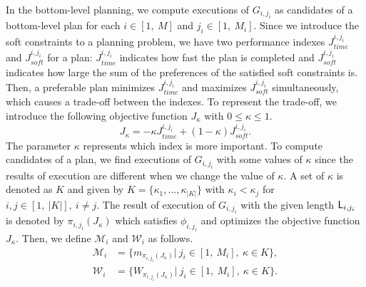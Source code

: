 \documentclass[journal,twoside,web]{IEEEtran}
\newcommand{\Len}{{\sf L}}
\newcommand{\red}[1]{\textcolor{red}{#1}}
\begin{document}
In the bottom-level planning, we compute executions of $G_{i,{j_i}}$ as candidates of a bottom-level plan for each $i\in[1,~M]$ and $j_i\in[1,~M_i]$.
%
Since we introduce the soft constraints to a planning problem, we have two performance indexes $J_{time}^{i,j_i}$ and $J_{soft}^{i,j_i}$ for a plan: $J_{time}^{i,j_i}$ indicates how fast the plan is completed and $J_{soft}^{i,j_i}$ indicates how large the sum of the preferences of the satisfied soft constraints is.
Then, a preferable plan minimizes $J_{time}^{i,j_i}$ and maximizes $J_{soft}^{i,j_i}$ simultaneously, which causes a trade-off between the indexes. 
To represent the trade-off, we introduce the following objective function $J_{\kappa}$ with $0 \leq \kappa \leq 1$.
\begin{equation}
J_{\kappa}=-\kappa J_{time}^{i,j_i} + (1-\kappa) J_{soft}^{i,j_i}.
\end{equation}
The parameter $\kappa$ represents which index is more important.
%
To compute candidates of a plan, we find executions of $G_{i,{j_i}}$ with some values of $\kappa$ since the results of execution are different when we change the value of $\kappa$.
%
A set of $\kappa$ is denoted as $K$ and given by
$K=\{\kappa_1,\ldots,\kappa_{|K|}\}$ with $\kappa_i< \kappa_j$ for $i,j\in [1,~|K|],~i\neq j$.
%
The result of execution of $G_{i,{j_i}}$ with the given length $\Len_{i,{j_i}}$ is denoted by $\pi_{i,{j_i}}(J_\kappa)$ which satisfies $\phi_{i,{j_i}}$ and optimizes the objective function $J_\kappa$.
%
%
Then, we define $\mathcal{M}_i$ and $\mathcal{W}_i$ as follows.
\begin{align}
\mathcal{M}_i&=\{m_{\pi_{i,{j_i}}(J_\kappa)}|~j_i\in[1,~M_i],~\kappa\in K\},\\
\mathcal{W}_i&=\{W_{\pi_{i,{j_i}}(J_\kappa)}|~j_i\in[1,~M_i],~\kappa\in K\}.
\end{align}
%
\end{document}

